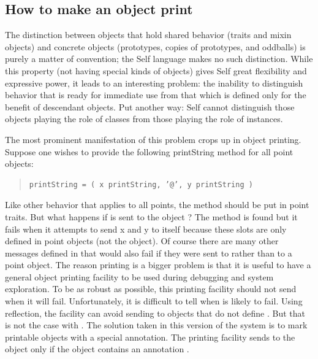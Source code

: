 \documentclass[letterpaper,10pt,english]{sphinxmanual}
\begin{document}
\subsection{How to make an object print}
\label{progguid:how-to-make-an-object-print}
The distinction between objects that hold shared behavior (traits and mixin objects) and concrete
objects (prototypes, copies of prototypes, and oddballs) is purely a matter of convention; the Self
language makes no such distinction. While this property (not having special kinds of objects) gives
Self great flexibility and expressive power, it leads to an interesting problem: the inability to distinguish
behavior that is ready for immediate use from that which is defined only for the benefit of
descendant objects. Put another way: Self cannot distinguish those objects playing the role of
classes from those playing the role of instances.

The most prominent manifestation of this problem crops up in object printing. Suppose one wishes
to provide the following printString method for all point objects:
\begin{quote}

\begin{Verbatim}[commandchars=\\\{\}]
printString = ( x printString, ’@’, y printString )
\end{Verbatim}
\end{quote}

Like other behavior that applies to all points, the method should be put in point traits. But what
happens if  is sent to the object ? The  method is
found but it fails when it attempts to send x and y to itself because these slots are only defined in
point objects (not the  object). Of course there are many other messages defined in
 that would also fail if they were sent to  rather than to a point
object. The reason printing is a bigger problem is that it is useful to have a general object printing
facility to be used during debugging and system exploration. To be as robust as possible, this printing
facility should not send  when it will fail. Unfortunately, it is difficult to tell
when  is likely to fail. Using reflection, the facility can avoid sending
 to objects that do not define . But that is not the case with .
The solution taken in this version of the system is to mark printable objects with a special
annotation. The printing facility sends  to the object only if the object contains an
annotation .
\end{document}
